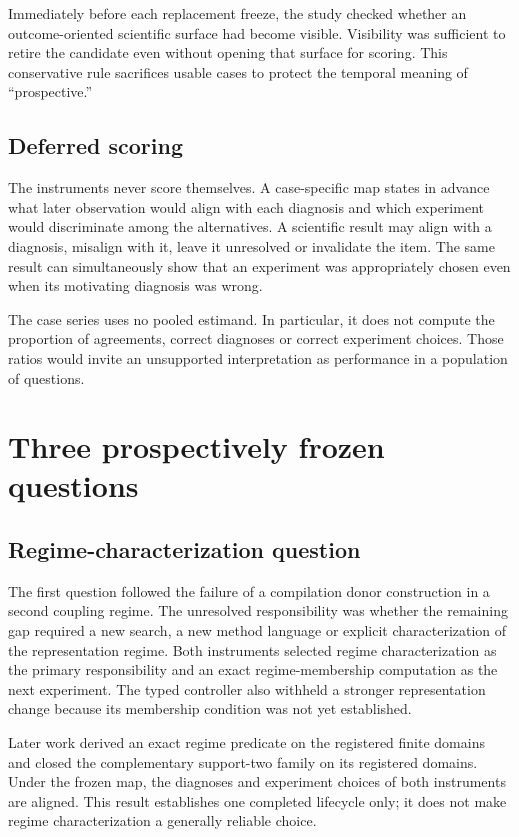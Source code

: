 \documentclass[10pt]{article}
\begin{document}
Immediately before each replacement freeze, the study checked whether an outcome-oriented scientific surface had become visible. Visibility was sufficient to retire the candidate even without opening that surface for scoring. This conservative rule sacrifices usable cases to protect the temporal meaning of ``prospective.''

\subsection{Deferred scoring}

The instruments never score themselves. A case-specific map states in advance what later observation would align with each diagnosis and which experiment would discriminate among the alternatives. A scientific result may align with a diagnosis, misalign with it, leave it unresolved or invalidate the item. The same result can simultaneously show that an experiment was appropriately chosen even when its motivating diagnosis was wrong.

The case series uses no pooled estimand. In particular, it does not compute the proportion of agreements, correct diagnoses or correct experiment choices. Those ratios would invite an unsupported interpretation as performance in a population of questions.

\section{Three prospectively frozen questions}

\subsection{Regime-characterization question}

The first question followed the failure of a compilation donor construction in a second coupling regime. The unresolved responsibility was whether the remaining gap required a new search, a new method language or explicit characterization of the representation regime. Both instruments selected regime characterization as the primary responsibility and an exact regime-membership computation as the next experiment. The typed controller also withheld a stronger representation change because its membership condition was not yet established.

Later work derived an exact regime predicate on the registered finite domains and closed the complementary support-two family on its registered domains. Under the frozen map, the diagnoses and experiment choices of both instruments are aligned. This result establishes one completed lifecycle only; it does not make regime characterization a generally reliable choice.
\end{document}
